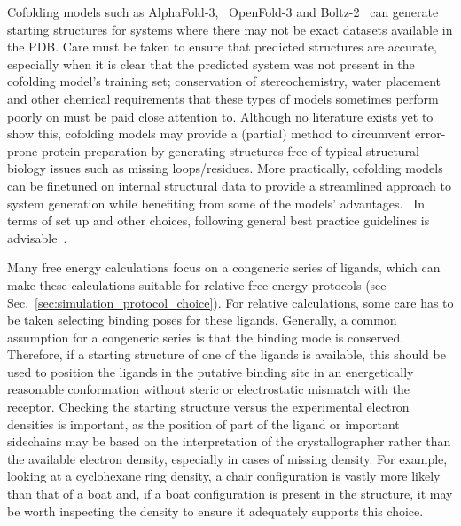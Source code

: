 \documentclass[9pt,bestpractices]{livecoms}
\begin{document}
Cofolding models such as AlphaFold-3,~\cite{abramson_2024} OpenFold-3 and Boltz-2~\cite{passaro_2025} can generate starting structures for systems where there may not be exact datasets available in the PDB. Care must be taken to ensure that predicted structures are accurate, especially when it is clear that the predicted system was not present in the cofolding model's training set; conservation of stereochemistry, water placement and other chemical requirements that these types of models sometimes perform poorly on must be paid close attention to. Although no literature exists yet to show this, cofolding models may provide a (partial) method to circumvent error-prone protein preparation by generating structures free of typical structural biology issues such as missing loops/residues. More practically, cofolding models can be finetuned on internal structural data to provide a streamlined approach to system generation while benefiting from some of the models' advantages.~\cite{scheen_2025,thaler_2025, beuming_2022, coskun_2023} In terms of set up and other choices, following general best practice guidelines is advisable~\cite{braun2019best}. 

Many free energy calculations focus on a congeneric series of ligands, which can make these calculations suitable for relative free energy protocols (see Sec.~\ref{sec:simulation_protocol_choice}). For relative calculations, some care has to be taken selecting binding poses for these ligands. Generally, a common assumption for a congeneric series is that the binding mode is conserved. Therefore, if a starting structure of one of the ligands is available, this should be used to position the ligands in the putative binding site in an energetically reasonable conformation without steric or electrostatic mismatch with the receptor. Checking the starting structure versus the experimental electron densities is important, as the position of part of the ligand or important sidechains may be based on the interpretation of the crystallographer rather than the available electron density, especially in cases of missing density. For example, looking at a cyclohexane ring density, a chair configuration is vastly more likely than that of a boat and, if a boat configuration is present in the structure, it may be worth inspecting the density to ensure it adequately supports this choice. 
\end{document}
